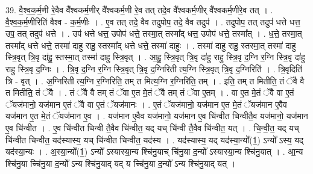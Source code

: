 \documentclass[17pt]{extarticle}
\begin{document}
39. वै॒श्व॒क॒र्म॒णी रे॒वैव वै᳚श्वकर्म॒णीर् वै᳚श्वकर्म॒णी रे॒व तत् तदे॒व वै᳚श्वकर्म॒णीर् वै᳚श्वकर्म॒णीरे॒व तत् । . वै॒श्व॒क॒र्म॒णीरिति॑ वैश्व - क॒र्म॒णीः । . ए॒व तत् तदे॒ वैव तदुपोप॒ तदे॒ वैव तदुप॑ । . तदुपोप॒ तत् तदुप॑ धत्ते धत्त॒ उप॒ तत् तदुप॑ धत्ते । . उप॑ धत्ते धत्त॒ उपोप॑ धत्ते॒ तस्मा॒त् तस्मा᳚द् धत्त॒ उपोप॑ धत्ते॒ तस्मा᳚त् । . ध॒त्ते॒ तस्मा॒त् तस्मा᳚द् धत्ते धत्ते॒ तस्मा॑ दाहु राहु॒ स्तस्मा᳚द् धत्ते धत्ते॒ तस्मा॑ दाहुः । . तस्मा॑ दाहु राहु॒ स्तस्मा॒त् तस्मा॑ दाहु स्त्रि॒वृत् त्रि॒वृ दा॑हु॒ स्तस्मा॒त् तस्मा॑ दाहु स्त्रि॒वृत् । . आ॒हु॒ स्त्रि॒वृत् त्रि॒वृ दा॑हु राहु स्त्रि॒वृ द॒ग्नि र॒ग्नि स्त्रि॒वृ दा॑हु राहु स्त्रि॒वृ द॒ग्निः । . त्रि॒वृ द॒ग्नि र॒ग्नि स्त्रि॒वृत् त्रि॒वृ द॒ग्निरिती त्य॒ग्नि स्त्रि॒वृत् त्रि॒वृ द॒ग्निरिति॑ । . त्रि॒वृदिति॑ त्रि - वृत् । . अ॒ग्निरिती त्य॒ग्नि र॒ग्निरिति॒ तम् त मित्य॒ग्नि र॒ग्निरिति॒ तम् । . इति॒ तम् त मितीति॒ तं ॅवै वै त मितीति॒ तं ॅवै । . तं ॅवै वै तम् तं ॅवा ए॒त मे॒तं ॅवै तम् तं ॅवा ए॒तम् । . वा ए॒त मे॒तं ॅवै वा ए॒तं ॅयज॑मानो॒ यज॑मान ए॒तं ॅवै वा ए॒तं ॅयज॑मानः । . ए॒तं ॅयज॑मानो॒ यज॑मान ए॒त मे॒तं ॅयज॑मान ए॒वैव यज॑मान ए॒त मे॒तं ॅयज॑मान ए॒व । . यज॑मान ए॒वैव यज॑मानो॒ यज॑मान ए॒व चि॑न्वीत चिन्वीतै॒व यज॑मानो॒ यज॑मान ए॒व चि॑न्वीत । . ए॒व चि॑न्वीत चिन्वी तै॒वैव चि॑न्वीत॒ यद् यच् चि॑न्वी तै॒वैव चि॑न्वीत॒ यत् । . चि॒न्वी॒त॒ यद् यच् चि॑न्वीत चिन्वीत॒ यद॑स्यास्य॒ यच् चि॑न्वीत चिन्वीत॒ यद॑स्य । . यद॑स्यास्य॒ यद् यद॑स्या॒न्यो᳚(1॒) ऽन्यो᳚ ऽस्य॒ यद् यद॑स्या॒न्यः । . अ॒स्या॒न्यो᳚(1॒) ऽन्यो᳚ ऽस्यास्या॒न्य श्चि॑नु॒याच् चि॑नु॒या द॒न्यो᳚ ऽस्यास्या॒न्य श्चि॑नु॒यात् । . आ॒न्य श्चि॑नु॒या च्चि॑नु॒या द॒न्यो᳚ ऽन्य श्चि॑नु॒याद् यद् य च्चि॑नु॒या द॒न्यो᳚ ऽन्य श्चि॑नु॒याद् यत् । \newline
\end{document}
